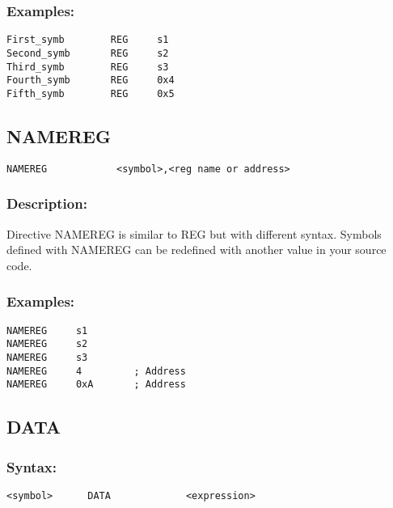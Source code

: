         \subsubsection{Examples:}
        {
            \usecodefont
            \verb'First_symb        REG     s1'\\
            \verb'Second_symb       REG     s2'\\
            \verb'Third_symb        REG     s3'\\
            \verb'Fourth_symb       REG     0x4'\\
            \verb'Fifth_symb        REG     0x5'\\
        }

        \subsection{NAMEREG}
        {
            \usecodefont
            \verb'NAMEREG            <symbol>,<reg name or address> '
        }

        \subsubsection{Description:}
            Directive NAMEREG is similar to REG but with different syntax. Symbols defined with NAMEREG can be redefined with another value in your source code.

        \subsubsection{Examples:}
        {
            \usecodefont
            \verb'NAMEREG     s1'\\
            \verb'NAMEREG     s2'\\
            \verb'NAMEREG     s3'\\
            \verb'NAMEREG     4         ; Address'\\
            \verb'NAMEREG     0xA       ; Address'\\
        }


    \subsection{DATA}
        \subsubsection{Syntax:}
        {
            \usecodefont
            \verb'<symbol>      DATA             <expression>'
        }

